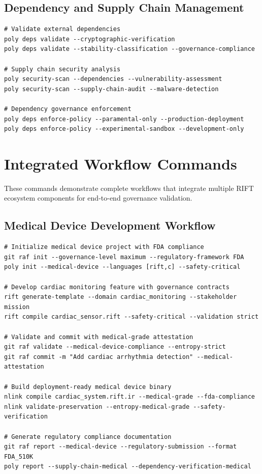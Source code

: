 \documentclass[11pt,letterpaper]{article}
\begin{document}
\subsection{Dependency and Supply Chain Management}

\begin{lstlisting}[language=shell, caption=Supply Chain Security Commands]
# Validate external dependencies
poly deps validate --cryptographic-verification
poly deps validate --stability-classification --governance-compliance

# Supply chain security analysis
poly security-scan --dependencies --vulnerability-assessment
poly security-scan --supply-chain-audit --malware-detection

# Dependency governance enforcement
poly deps enforce-policy --paramental-only --production-deployment
poly deps enforce-policy --experimental-sandbox --development-only
\end{lstlisting}

\section{Integrated Workflow Commands}

These commands demonstrate complete workflows that integrate multiple RIFT ecosystem components for end-to-end governance validation.

\subsection{Medical Device Development Workflow}

\begin{lstlisting}[language=shell, caption=Medical Device Development Pipeline]
# Initialize medical device project with FDA compliance
git raf init --governance-level maximum --regulatory-framework FDA
poly init --medical-device --languages [rift,c] --safety-critical

# Develop cardiac monitoring feature with governance contracts
rift generate-template --domain cardiac_monitoring --stakeholder mission
rift compile cardiac_sensor.rift --safety-critical --validation strict

# Validate and commit with medical-grade attestation
git raf validate --medical-device-compliance --entropy-strict
git raf commit -m "Add cardiac arrhythmia detection" --medical-attestation

# Build deployment-ready medical device binary
nlink compile cardiac_system.rift.ir --medical-grade --fda-compliance
nlink validate-preservation --entropy-medical-grade --safety-verification

# Generate regulatory compliance documentation
git raf report --medical-device --regulatory-submission --format FDA_510K
poly report --supply-chain-medical --dependency-verification-medical
\end{lstlisting}
\end{document}
